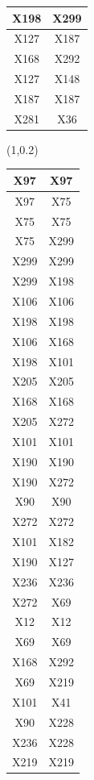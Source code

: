 \documentclass{beamer}
\newcommand{\boz}{\cellcolor{pathwaynode}}
\begin{document}
\begin{frame}[plain]
\begin{textblock*}{\paperwidth}
\begin{tabular}{| c c |}
X198   &  X299  \\ \hline
X127   &  X187  \\ \hline
X168   &  X292  \\ \hline
X127   &  \boz X148  \\ \hline
X187   &  X187  \\ \hline
X281   &  X36  \\ \hline
    \end{tabular}
    \hspace{.5em}
  \end{textblock*}
  \begin{textblock*}{\paperwidth}(1\textwidth,0.2\textheight)
    \raggedright 
    \tiny
    \begin{tabular}{| c c |}
      \hline
X97   &  X97  \\ \hline
X97   &  X75  \\ \hline
X75   &  X75  \\ \hline
X75   &  X299  \\ \hline
X299   &  X299  \\ \hline
X299   &  X198  \\ \hline
X106   &  X106  \\ \hline
X198   &  X198  \\ \hline
X106   &  X168  \\ \hline
X198   &  X101  \\ \hline
X205   &  X205  \\ \hline
X168   &  X168  \\ \hline
X205   &  \boz X272  \\ \hline
X101   &  X101  \\ \hline
\boz X190   &  \boz X190  \\ \hline
\boz X190   &  \boz X272  \\ \hline
X90   &  X90  \\ \hline
\boz X272   &  \boz X272  \\ \hline
X101   &  X182  \\ \hline
\boz X190   &  X127  \\ \hline
X236   &  X236  \\ \hline
\boz X272   &  X69  \\ \hline
X12   &  X12  \\ \hline
X69   &  X69  \\ \hline
X168   &  X292  \\ \hline
X69   &  X219  \\ \hline
X101   &  X41  \\ \hline
X90   &  \boz X228  \\ \hline
X236   &  \boz X228  \\ \hline
X219   &  X219  \\ \hline
    \end{tabular}
    \hspace{.5em}
  \end{textblock*}
\end{frame}
\end{document}
